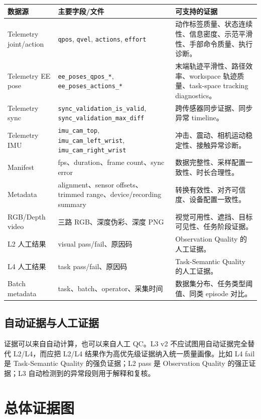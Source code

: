 \documentclass[UTF8,zihao=-4,oneside,openany]{ctexrep}
\newcommand{\Code}[1]{\texttt{#1}}
\begin{document}
\begin{longtable}{L{3.4cm} L{3.8cm} L{6.5cm}}
\toprule
数据源 & 主要字段/文件 & 可支持的证据 \\
\midrule
Telemetry joint/action & \Code{qpos}, \Code{qvel}, \Code{actions}, \Code{effort} & 动作标签质量、状态连续性、信息密度、示范平滑性、手部命令质量、执行诊断。 \\
Telemetry EE pose & \Code{ee\_poses\_qpos\_*}, \Code{ee\_poses\_actions\_*} & 末端轨迹平滑性、路径效率、workspace 轨迹质量、task-space tracking diagnostics。 \\
Telemetry sync & \Code{sync\_validation\_is\_valid}, \Code{sync\_validation\_max\_diff} & 跨传感器同步证据、同步异常 timeline。 \\
Telemetry IMU & \Code{imu\_cam\_top}, \Code{imu\_cam\_left\_wrist}, \Code{imu\_cam\_right\_wrist} & 冲击、震动、相机运动稳定性、接触异常诊断。 \\
Manifest & fps、duration、frame count、sync error & 数据完整性、采样配置一致性、时长合理性。 \\
Metadata & alignment、sensor offsets、trimmed range、device/recording summary & 转换有效性、对齐可信度、设备配置一致性。 \\
RGB/Depth video & 三路 RGB、深度伪彩、深度 PNG & 视觉可用性、遮挡、目标可见性、任务阶段证据。 \\
L2 人工结果 & visual pass/fail、原因码 & Observation Quality 的人工证据。 \\
L4 人工结果 & task pass/fail、原因码 & Task-Semantic Quality 的人工证据。 \\
Batch metadata & task、batch、operator、采集时间 & 数据集分布、任务类型阈值、同类 episode 对比。 \\
\bottomrule
\end{longtable}

\subsection{自动证据与人工证据}

证据可以来自自动计算，也可以来自人工 QC。L3 v2 不应试图用自动证据完全替代 L2/L4，而应把 L2/L4 结果作为高优先级证据纳入统一质量画像。比如 L4 fail 是 Task-Semantic Quality 的强负证据；L2 pass 是 Observation Quality 的强正证据；L3 自动检测到的异常段则用于解释和复核。

\section{总体证据图}
\end{document}
